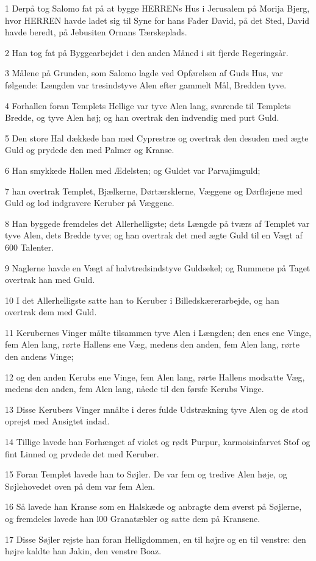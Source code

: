 \par 1 Derpå tog Salomo fat på at bygge HERRENs Hus i Jerusalem på Morija Bjerg, hvor HERREN havde ladet sig til Syne for hans Fader David, på det Sted, David havde beredt, på Jebusiten Ornans Tærskeplads.
\par 2 Han tog fat på Byggearbejdet i den anden Måned i sit fjerde Regeringsår.
\par 3 Målene på Grunden, som Salomo lagde ved Opførelsen af Guds Hus, var følgende: Længden var tresindstyve Alen efter gammelt Mål, Bredden tyve.
\par 4 Forhallen foran Templets Hellige var tyve Alen lang, svarende til Templets Bredde, og tyve Alen høj; og han overtrak den indvendig med purt Guld.
\par 5 Den store Hal dækkede han med Cyprestræ og overtrak den desuden med ægte Guld og prydede den med Palmer og Kranse.
\par 6 Han smykkede Hallen med Ædelsten; og Guldet var Parvajimguld;
\par 7 han overtrak Templet, Bjælkerne, Dørtærsklerne, Væggene og Dørfløjene med Guld og lod indgravere Keruber på Væggene.
\par 8 Han byggede fremdeles det Allerhelligste; dets Længde på tværs af Templet var tyve Alen, dets Bredde tyve; og han overtrak det med ægte Guld til en Vægt af 600 Talenter.
\par 9 Naglerne havde en Vægt af halvtredsindstyve Guldsekel; og Rummene på Taget overtrak han med Guld.
\par 10 I det Allerhelligste satte han to Keruber i Billedskærerarbejde, og han overtrak dem med Guld.
\par 11 Kerubernes Vinger målte tilsammen tyve Alen i Længden; den enes ene Vinge, fem Alen lang, rørte Hallens ene Væg, medens den anden, fem Alen lang, rørte den andens Vinge;
\par 12 og den anden Kerubs ene Vinge, fem Alen lang, rørte Hallens modsatte Væg, medens den anden, fem Alen lang, nåede til den førsfe Kerubs Vinge.
\par 13 Disse Kerubers Vinger mnålte i deres fulde Udstrækning tyve Alen og de stod oprejst med Ansigtet indad.
\par 14 Tillige lavede han Forhænget af violet og rødt Purpur, karmoisinfarvet Stof og fint Linned og prvdede det med Keruber.
\par 15 Foran Templet lavede han to Søjler. De var fem og tredive Alen høje, og Søjlehovedet oven på dem var fem Alen.
\par 16 Så lavede han Kranse som en Halskæde og anbragte dem øverst på Søjlerne, og fremdeles lavede han l00 Granatæbler og satte dem på Kransene.
\par 17 Disse Søjler rejste han foran Helligdommen, en til højre og en til venstre: den højre kaldte han Jakin, den venstre Boaz.

